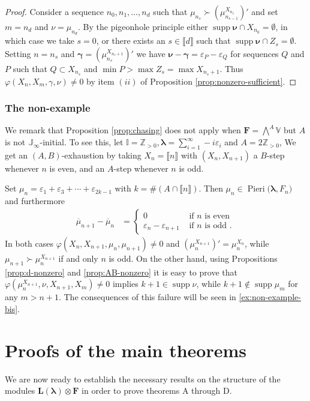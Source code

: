 \documentclass[11pt,fleqn]{amsart}
\newcommand\ZZ{\mathbb Z}
\newcommand\II{\mathbb I}
\newcommand\JJ{\mathbb J}
\renewcommand\phi{\varphi}
\renewcommand\epsilon{\varepsilon}
\theoremstyle{definition}
\theoremstyle{remark}
\theoremstyle{remark}
\newcommand\VV{\mathbb V}
\newcommand\interval[1]{\llbracket{#1}\rrbracket}
\newcommand\wt[1]{\boldsymbol{#1}}
\DeclareMathOperator\supp{supp}
\newcommand\Pieri[2]{\operatorname{Pieri}{(#1},{#2)}}
\newcommand\map[4]{\phi(#3,#4,#1,#2)}
\begin{document}
\begin{proof}
Consider a sequence $n_0, n_1, \ldots, n_d$ such that $\mu_{n_{s}} 
\succ (\mu_{n_{s-1}}^{X_{n_s}})'$ and set $m = n_d$ and $\nu = 
\mu_{n_d}$. By the pigeonhole principle either $\supp\wt\nu \cap X_{n_0} = 
\emptyset$, in which case we take $s = 0$, or there exists an $s \in \interval 
d$ such that $\supp\wt\nu \cap Z_s = \emptyset$. Setting $n = n_s$ and 
$\wt\gamma = (\mu_{n_s}^{X_{n_s+1}})'$ we have $\wt\nu - \wt\gamma = 
\epsilon_{P} - \epsilon_{Q}$ for sequences $Q$ and $P$ such that $Q \subset 
X_{n_s}$ and $\min P > \max Z_{s} = \max X_{n_s + 1}$. Thus 
$\map{\gamma}{\nu}{X_n}{X_m} \neq 0$ by item $(ii)$ of Proposition 
\ref{prop:nonzero-sufficient}.
\end{proof}

\subsubsection{The non-example}
\label{ex:non-ex}
We remark that Proposition \ref{prop:chasing} does not apply when $\mathbf F 
= \bigwedge^A \VV$ but $A$ is not $\JJ_\infty$-initial. To see this, let $\II 
= \ZZ_{>0}, \wt\lambda = \sum_{i=1}^\infty -i \epsilon_i$ and $A = 2 \ZZ_{>0}$,
We get an $(A,B)$-exhaustion by taking $X_n = \interval n$ with $(X_n,X_{n+1})$
a $B$-step whenever $n$ is even, and an $A$-step whenever $n$ is odd. 

Set $\mu_n = \epsilon_1 + \epsilon_3 + \cdots + \epsilon_{2k-1}$ with $k = \# 
(A \cap \interval n)$. Then $\mu_n \in \Pieri{\wt\lambda}{F_n}$ and furthermore
\begin{align*}
  \overline \mu_{n+1} - \overline \mu_n 
    &= \begin{cases}
      0 & \mbox { if $n$ is even } \\
      \epsilon_n - \epsilon_{n+1}   & \mbox { if $n$ is odd }.
    \end{cases} 
\end{align*}
In both cases $\map{\mu_n}{\mu_{n+1}}{X_n}{X_{n+1}} \neq 0$ and 
$(\mu_n^{X_{n+1}})' = \mu_n^{X_n}$, while $\mu_{n+1} \succ \mu_n^{X_{n+1}}$ if 
and only $n$ is odd. On the other hand, using Propositions \ref{prop:d-nonzero}
and \ref{prop:AB-nonzero} it is easy to prove that $\map{X_{n+1}}{X_m}
{\mu_{n}^{X_{n+1}}}{\nu} \neq 0$ implies $k+1 \in \supp \nu$, while $k+1 \notin 
\supp \mu_m$ for any $m > n+1$. The consequences of this failure will be seen in
\ref{ex:non-example-bis}.


\section{Proofs of the main theorems}
We are now ready to establish the necessary results on the structure of 
the modules $\mathbf L(\wt\lambda) \otimes \mathbf F$ in order to prove 
theorems A through D.
\end{document}
